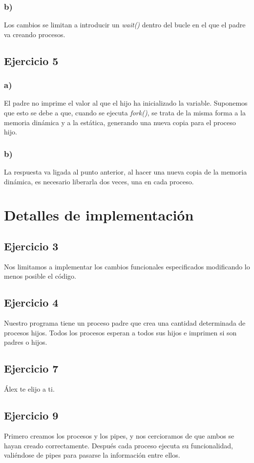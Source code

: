 \documentclass[]{article}
\begin{document}
\subsubsection*{b)}
Los cambios se limitan a introducir un \textit{wait()} dentro del bucle en el que el padre va creando procesos.

\subsection*{Ejercicio 5}
\subsubsection*{a)}
El padre no imprime el valor al que el hijo ha inicializado la variable. Suponemos que esto se debe a que, cuando se ejecuta \textit{fork()}, se trata de la misma forma a la memoria dinámica y a la estática, generando una nueva copia para el proceso hijo.

\subsubsection*{b)}
La respuesta va ligada al punto anterior, al hacer una nueva copia de la memoria dinámica, es necesario liberarla dos veces, una en cada proceso.

\section*{Detalles de implementación}
\subsection*{Ejercicio 3}
Nos limitamos a implementar los cambios funcionales especificados modificando lo menos posible el código.

\subsection*{Ejercicio 4}
Nuestro programa tiene un proceso padre que crea una cantidad determinada de procesos hijos. Todos los procesos esperan a todos sus hijos e imprimen si son padres o hijos.

\subsection*{Ejercicio 7}
Álex te elijo a ti.

\subsection*{Ejercicio 9}
Primero creamos los procesos y los pipes, y nos cercioramos de que ambos se hayan creado correctamente. Después cada proceso ejecuta su funcionalidad, valiéndose de pipes para pasarse la información entre ellos.
\end{document}
